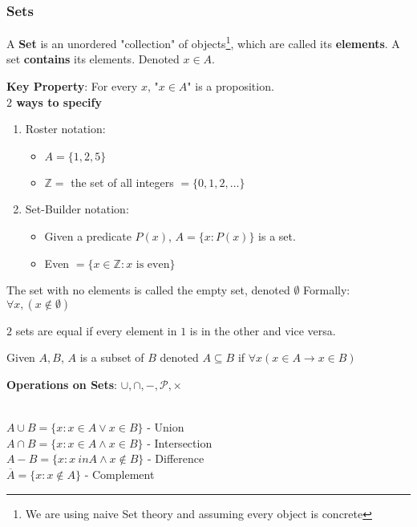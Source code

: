\documentclass[11pt]{scrartcl}
\begin{document}
\subsubsection{Sets}
\begin{definition}[Set]
    A \textbf{Set} is an unordered "collection" of objects\footnote{We are using naive Set theory and assuming every object is concrete}, which are called its \textbf{elements}.  A set \textbf{contains} its elements. Denoted $x \in A$.
\end{definition}
\textbf{Key Property}: For every $x$, "$x \in A$" is a proposition.\\
\textbf{$2$ ways to specify}\begin{enumerate}
    \item Roster notation: \begin{itemize}
        \item $A = \{1, 2, 5\}$ 
        \item $\mathbb{Z} =$ the set of all integers $= \{0, 1, 2, \ldots\}$
    \end{itemize}  
    \item Set-Builder notation: \begin{itemize}
        \item Given a predicate $P(x)$, $A = \{x:P(x)\}$ is a set.
        \item Even $ = \{x \in \mathbb{Z} : x \text{ is even}\}$
    \end{itemize}
\end{enumerate}
\begin{definition}
    The set with no elements is called the empty set, denoted $\emptyset$
    Formally: $\forall x, (x \notin \emptyset)$
\end{definition}
\begin{definition}
    $2$ sets are equal if every element in $1$ is in the other and vice versa.
\end{definition}
\begin{definition}
    Given $A, B$, $A$ is a subset of $B$ denoted $A \subseteq B$ if $\forall x (x\in A \rightarrow x \in B)$
\end{definition}
\textbf{Operations on Sets}: $\cup, \cap, -, \mathcal{P}, \times$
\begin{definition}\\
    $A\cup B = \{x: x\in A \vee x \in B\}$ - Union\\
    $A \cap B = \{x: x\in A \land x \in B\}$ - Intersection\\
    $A-B = \{x:  x\ in A \land x \notin B\}$ - Difference \\
    $\overline{A} = \{x: x \notin A\}$ - Complement
\end{definition}
\end{document}
